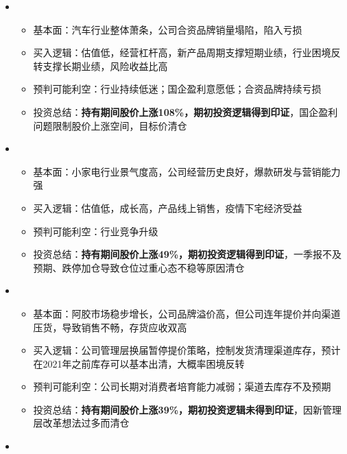   \begin{itemize}[leftmargin=*]
    \item
      {\small
      \begin{itemize}
        \item 基本面：汽车行业整体萧条，公司合资品牌销量塌陷，陷入亏损
        \item 买入逻辑：估值低，经营杠杆高，新产品周期支撑短期业绩，行业困境反转支撑长期业绩，风险收益比高
        \item 预判可能利空：行业持续低迷；国企盈利意愿低；合资品牌持续亏损
        \item 投资总结：\textbf{持有期间股价上涨108\%，期初投资逻辑得到印证}，国企盈利问题限制股价上涨空间，目标价清仓
      \end{itemize}
      }
    \item
      {\small
      \begin{itemize}
        \item 基本面：小家电行业景气度高，公司经营历史良好，爆款研发与营销能力强
        \item 买入逻辑：估值低，成长高，产品线上销售，疫情下宅经济受益
        \item 预判可能利空：行业竞争升级
        \item 投资总结：\textbf{持有期间股价上涨49\%，期初投资逻辑得到印证}，一季报不及预期、跌停加仓导致仓位过重心态不稳等原因清仓
      \end{itemize}
      }
    \item
      {\small
      \begin{itemize}
        \item 基本面：阿胶市场稳步增长，公司品牌溢价高，但公司连年提价并向渠道压货，导致销售不畅，存货应收双高
        \item 买入逻辑：公司管理层换届暂停提价策略，控制发货清理渠道库存，预计在2021年之前库存可以基本出清，大概率困境反转
        \item 预判可能利空：公司长期对消费者培育能力减弱；渠道去库存不及预期
        \item 投资总结：\textbf{持有期间股价上涨39\%，期初投资逻辑未得到印证}，因新管理层改革想法过多而清仓
      \end{itemize}
      }
    \item
      {\small
}
\end{itemize}
